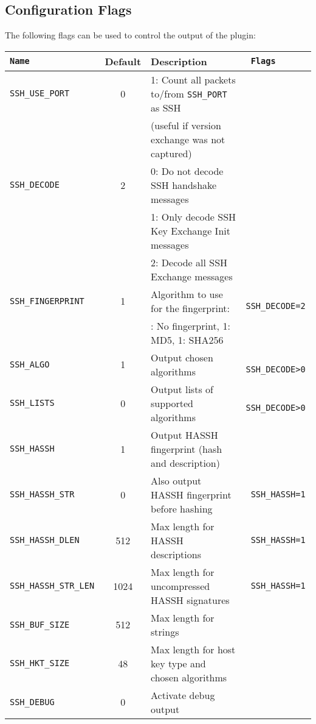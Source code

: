 \documentclass[documentation]{subfiles}
\begin{document}
\subsection{Configuration Flags}
The following flags can be used to control the output of the plugin:
\begin{longtable}{>{\tt}lcl>{\tt\small}l}
    \toprule
    {\bf Name} & {\bf Default} & {\bf Description} & {\bf Flags}\\
    \midrule\endhead%
    SSH\_USE\_PORT       & 0    & 1: Count all packets to/from {\tt SSH\_PORT} as SSH & \\
                         &      & (useful if version exchange was not captured)       & \\
    SSH\_DECODE          & 2    & 0: Do not decode SSH handshake messages             & \\
                         &      & 1: Only decode SSH Key Exchange Init messages       & \\
                         &      & 2: Decode all SSH Exchange messages                 & \\
    SSH\_FINGERPRINT     & 1    & Algorithm to use for the fingerprint:               & SSH\_DECODE=2\\
                         &      & \qquad 0: No fingerprint, 1: MD5, 1: SHA256         & \\
    SSH\_ALGO            & 1    & Output chosen algorithms                            & SSH\_DECODE>0\\
    SSH\_LISTS           & 0    & Output lists of supported algorithms                & SSH\_DECODE>0\\
    SSH\_HASSH           & 1    & Output HASSH fingerprint (hash and description)     & \\
    SSH\_HASSH\_STR      & 0    & Also output HASSH fingerprint before hashing        & SSH\_HASSH=1\\
    SSH\_HASSH\_DLEN     & 512  & Max length for HASSH descriptions                   & SSH\_HASSH=1\\
    SSH\_HASSH\_STR\_LEN & 1024 & Max length for uncompressed HASSH signatures        & SSH\_HASSH=1\\
    SSH\_BUF\_SIZE       & 512  & Max length for strings                              & \\
    SSH\_HKT\_SIZE       & 48   & Max length for host key type and chosen algorithms  & \\
    SSH\_DEBUG           & 0    & Activate debug output                               & \\
    \bottomrule
\end{longtable}
\end{document}
